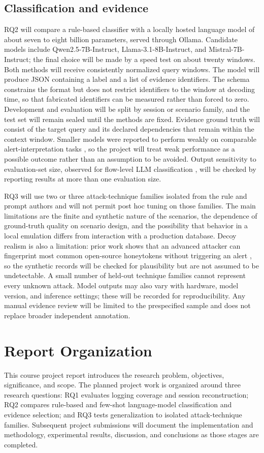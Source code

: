 \documentclass[12pt,a4paper]{report}
\begin{document}
\subsection*{Classification and evidence}
RQ2 will compare a rule-based classifier with a locally hosted language model of about seven to eight billion parameters, served through Ollama. Candidate models include Qwen2.5-7B-Instruct, Llama-3.1-8B-Instruct, and Mistral-7B-Instruct; the final choice will be made by a speed test on about twenty windows. Both methods will receive consistently normalized query windows. The model will produce JSON containing a label and a list of evidence identifiers. The schema constrains the format but does not restrict identifiers to the window at decoding time, so that fabricated identifiers can be measured rather than forced to zero. Development and evaluation will be split by session or scenario family, and the test set will remain sealed until the methods are fixed. Evidence ground truth will consist of the target query and its declared dependencies that remain within the context window. Smaller models were reported to perform weakly on comparable alert-interpretation tasks \cite{afzal_let_2027}, so the project will treat weak performance as a possible outcome rather than an assumption to be avoided. Output sensitivity to evaluation-set size, observed for flow-level LLM classification \cite{rehman_flows_2025}, will be checked by reporting results at more than one evaluation size.

RQ3 will use two or three attack-technique families isolated from the rule and prompt authors and will not permit post hoc tuning on those families. The main limitations are the finite and synthetic nature of the scenarios, the dependence of ground-truth quality on scenario design, and the possibility that behavior in a local emulation differs from interaction with a production database. Decoy realism is also a limitation: prior work shows that an advanced attacker can fingerprint most common open-source honeytokens without triggering an alert \cite{reiser_honeysweeper_2022}, so the synthetic records will be checked for plausibility but are not assumed to be undetectable. A small number of held-out technique families cannot represent every unknown attack. Model outputs may also vary with hardware, model version, and inference settings; these will be recorded for reproducibility. Any manual evidence review will be limited to the prespecified sample and does not replace broader independent annotation.

\section{Report Organization}
This course project report introduces the research problem, objectives, significance, and scope. The planned project work is organized around three research questions: RQ1 evaluates logging coverage and session reconstruction; RQ2 compares rule-based and few-shot language-model classification and evidence selection; and RQ3 tests generalization to isolated attack-technique families. Subsequent project submissions will document the implementation and methodology, experimental results, discussion, and conclusions as those stages are completed.
\end{document}
